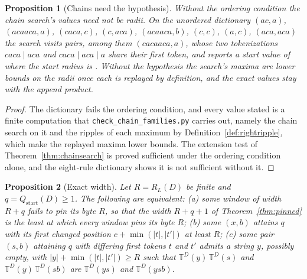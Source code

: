\documentclass[11pt,a4paper]{article}
\theoremstyle{definition}
\theoremstyle{plain}
\newtheorem{proposition}{Proposition}
\newcommand{\code}[1]{\texttt{#1}}
\newcommand{\T}{\mathbb{T}}
\newcommand{\ripple}{R_{L}}
\begin{document}
\begin{proposition}[Chains need the hypothesis]\label{prop:chainsfail}
Without the ordering condition the chain search's values need not be radii. On the unordered dictionary \((ac, a)\),
\((acaaca, a)\), \((caca, c)\), \((c, aca)\), \((acaaca, b)\), \((c, c)\), \((a, c)\), \((aca, aca)\) the search visits
\ChainNonstatePairs{} pairs, among them \((cacaaca, a)\), whose two tokenizations \(caca \mid aca\) and
\(caca \mid aca \mid a\) share their first token, and reports a start value of \ChainNonstateStart{} where the start
radius is \ChainNonstateProductStart{}. Without the hypothesis the search's maxima are lower bounds on the radii once
each is replayed by definition, and the exact values stay with the append product.
\end{proposition}

\begin{proof}
The dictionary fails the ordering condition, and every value stated is a finite computation that
\code{check\_chain\_families.py} carries out, namely the chain search on it and the ripples of each maximum by
Definition~\ref{def:rightripple}, which make the replayed maxima lower bounds. The extension test of
Theorem~\ref{thm:chainsearch} is proved sufficient under the ordering condition alone, and the eight-rule dictionary
shows it is not sufficient without it.
\end{proof}


\begin{proposition}[Exact width]\label{prop:exactwidth}
Let \(R = \ripple(D)\) be finite and \(q = Q_{\mathrm{start}}(D) \ge 1\). The following are equivalent: (a) some window
of width \(R + q\) fails to pin its byte \(R\), so that the width \(R + q + 1\) of Theorem~\ref{thm:pinned} is the least
at which every window pins its byte \(R\); (b) some \((x, b)\) attains \(q\) with its first changed position
\(c + \min(|t|, |t'|)\) at least \(R\); (c) some pair \((s, b)\) attaining \(q\) with differing first tokens \(t\) and
\(t'\) admits a string \(y\), possibly empty, with \(|y| + \min(|t|, |t'|) \ge R\) such that \(\T^D(y)\,\T^D(s)\) and
\(\T^D(y)\,\T^D(sb)\) are \(\T^D(ys)\) and \(\T^D(ysb)\).
\end{proposition}
\end{document}
